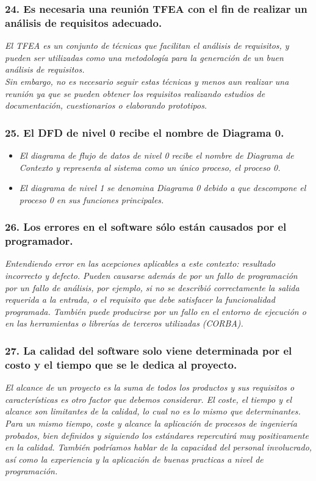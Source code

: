 \subsubsection*{24. Es necesaria una reunión TFEA con el fin de realizar un análisis de requisitos adecuado.}
\textit{El TFEA es un conjunto de técnicas que facilitan el análisis de requisitos, y pueden ser utilizadas como una metodología para la generación de un buen análisis de requisitos.
    \\
    Sin embargo, no es necesario seguir estas técnicas y menos aun realizar una reunión ya que se pueden obtener los requisitos realizando estudios de documentación, cuestionarios o elaborando prototipos.}

\subsubsection*{25. El DFD de nivel 0 recibe el nombre de Diagrama 0.}
\begin{itemize}
    \item \textit{El diagrama de flujo de datos de \emph{nivel 0} recibe el nombre de \emph{Diagrama de Contexto} y representa al sistema como un único proceso, el proceso 0.}
    \item \textit{El \emph{diagrama de nivel 1 se denomina Diagrama 0} debido a que \emph{descompone el proceso 0} en sus funciones principales.}

\end{itemize}

\subsubsection*{26. Los errores en el software sólo están causados por el programador.}
\textit{Entendiendo error en las acepciones aplicables a este contexto: resultado incorrecto y defecto. Pueden causarse además de por un fallo de programación por un fallo de análisis, por ejemplo, si no se describió correctamente la salida requerida a la entrada, o el requisito que debe satisfacer la funcionalidad programada. También puede producirse por un fallo en el entorno de ejecución o en las herramientas o librerías de terceros utilizadas (CORBA).}

\subsubsection*{27. La calidad del software solo viene determinada por el costo y el tiempo que se le dedica al proyecto.} %
\textit{El alcance de un proyecto es la suma de todos los productos y sus requisitos o características es otro factor que debemos considerar.
    El coste, el tiempo y el alcance son limitantes de la calidad, lo cual no es lo mismo que determinantes.\\
    Para un mismo tiempo, coste y alcance la aplicación de procesos de ingeniería probados, bien definidos y siguiendo los estándares repercutirá muy positivamente en la calidad. También podríamos hablar de la capacidad del personal involucrado, así como la experiencia y la aplicación de buenas practicas a nivel de programación.
}
